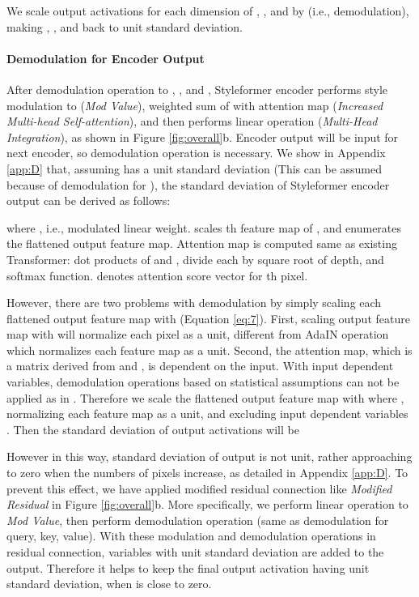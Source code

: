 \documentclass[10pt,twocolumn,letterpaper]{article}
\begin{document}
We scale output activations for each dimension of , , and  by (i.e., demodulation), making , , and  back to unit standard deviation. 



\paragraph{Demodulation for Encoder Output}
After demodulation operation to , , and , Styleformer encoder performs style modulation to  (\textit{Mod Value}), weighted sum of  with attention map (\textit{Increased Multi-head Self-attention}), and then performs linear operation (\textit{Multi-Head Integration}), as shown in Figure \ref{fig:overall}b. Encoder output will be input for next encoder, so demodulation operation is necessary.
We show in Appendix \ref{app:D} that, assuming  has a unit standard deviation (This can be assumed because of demodulation for ), the standard deviation of Styleformer encoder output can be derived as follows:

where , i.e., modulated linear weight.  scales th feature map of , and  enumerates the flattened output feature map. Attention map  is computed same as existing Transformer: dot products of  and , divide each by square root of depth, and softmax function.  denotes attention score vector for th pixel. 


However, there are two problems with demodulation by simply scaling each flattened output feature map  with  (Equation \ref{eq:7}).
First, scaling output feature map  with  will normalize each pixel as a unit, different from AdaIN operation which normalizes each feature map as a unit.
Second, the attention map, which is a matrix derived from  and , is dependent on the input. With input dependent variables, demodulation operations based on statistical assumptions can not be applied as in \cite{pmlr-v9-glorot10a}. Therefore we scale the flattened output feature map  with  where
    , normalizing each feature map as a unit, and excluding input dependent variables . Then the standard deviation of output activations will be 

However in this way, standard deviation of output is not unit, rather approaching to zero when the numbers of pixels increase, as detailed in Appendix \ref{app:D}.
To prevent this effect, we have applied modified residual connection like \textit{Modified Residual} in Figure \ref{fig:overall}b. More specifically, we perform linear operation to \textit{Mod Value}, then perform demodulation operation (same as demodulation for query, key, value). With these modulation and demodulation operations in residual connection, variables with unit standard deviation are added to the output. Therefore it helps to keep the final output activation having unit standard deviation, when  is close to zero.
\end{document}
